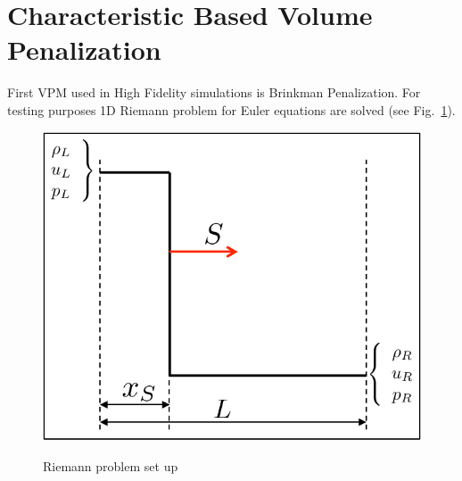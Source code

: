 \section{Characteristic Based Volume Penalization}
First VPM used in High Fidelity simulations is Brinkman Penalization. For testing purposes 1D Riemann problem for Euler equations are solved (see Fig.~\ref{fig:riemann_euler}).
\begin{figure}[h!]
\centering \includegraphics[scale=0.5]{fig/Riemann_Euler.pdf}\\
\caption{Riemann problem set up \label{fig:riemann_euler}}
\end{figure}

